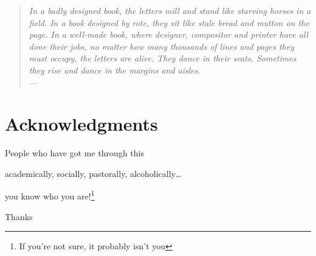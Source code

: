 \cleardoublepage

\begin{quote}{\slshape    
    In a badly designed book, the letters mill 
    and stand like starving horses in a field.
    In a book designed by rote, they sit 
    like stale bread and mutton on the page. 
    In a well-made book, where designer, compositor
    and printer have all done their jobs, 
    no matter how many thousands of lines and pages 
    they must occupy, the letters are alive. 
    They dance in their seats. 
    Sometimes they rise and dance in the margins and aisles. } \\ \medskip
    ---  \citep{Bringhurst2008}
\end{quote}



\bigskip

\begingroup
\let\clearpage\relax
\let\cleardoublepage\relax
\let\cleardoublepage\relax
\chapter*{Acknowledgments}

\medskip

\begin{center}
 People who have got me through this
\end{center}

\medskip

\begin{center}
academically, socially, pastorally, alcoholically\ldots
\end{center}

\medskip

\begin{center}
you know who you are!\footnote{If you're not sure, it probably isn't you}
\end{center}

\medskip

\begin{center}
Thanks
\end{center}



\endgroup



